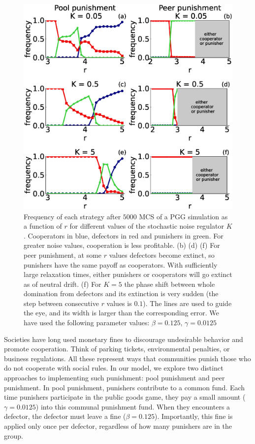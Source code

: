 \begin{figure}
	\centering
	\includegraphics[width=1\linewidth]{Images/P2/densidadVSr_L300t5000variosK.eps}
	\caption{Frequency of each strategy after $5000$ MCS of a PGG simulation as a function of $r$ for different values of the stochastic noise regulator $K$. Cooperators in blue, defectors in red and punishers in green. For greater noise values, cooperation is less profitable. (b) (d) (f) For peer punishment, at some $r$ values defectors become extinct, so  punishers have the same payoff as cooperators. With sufficiently large relaxation times, either punishers or cooperators will go extinct as of neutral drift. (f) For $K=5$ the phase shift between whole domination from defectors and its extinction is very sudden (the step between consecutive $r$ values is $0.1$). The lines are used to guide the eye, and its width is larger than the corresponding error. We have used the following parameter values: $\beta=0.125$, $\gamma=0.0125$}
	\label{densidad}
\end{figure}




Societies have long used monetary fines to discourage undesirable behavior and promote cooperation. Think of parking tickets, environmental penalties, or business regulations. All these represent ways that communities punish those who do not cooperate with social rules. In our model, we explore two distinct approaches to implementing such punishment: pool punishment and peer punishment. 
In pool punishment, punishers contribute to a common fund. Each time punishers participate in the public goods game, they pay a small amount ($\gamma=0.0125$) into this communal punishment fund. When they encounters a defector, the defector must leave a fine ($\beta=0.125$). Importantly, this fine is applied only once per defector, regardless of how many punishers are in the group.

